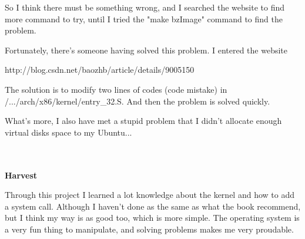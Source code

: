 \documentclass[12pt,a4paper]{article}
\begin{document}
So I think there must be something wrong, and I searched the website to find more command to try, until I tried the "make bzImage" command to find the problem.

  Fortunately, there's someone having solved this problem. I entered the website

\quad\quad\quad\quad\quad http://blog.csdn.net/baozhb/article/details/9005150

The solution is to modify two lines of codes (code mistake) in /.../arch/x86/kernel/entry\_32.S. And then the problem is solved quickly.

What's more, I also have met a stupid problem that I didn't allocate enough virtual disks space to my Ubuntu...

\begin{large}
~\\
~\\
\textbf{Harvest}
\end{large}

Through this project I learned a lot knowledge about the kernel and how to add a  system call. Although I haven't done as the same as what the book recommend, but I think my way is as good too, which is more simple. The operating system is a very fun thing to manipulate, and solving problems makes me very proudable.
\end{document}
